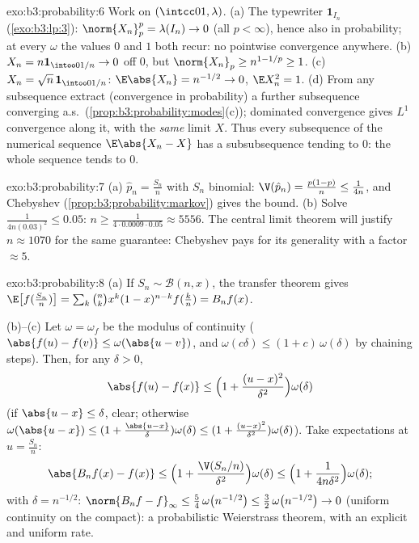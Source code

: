 \begin{solution}{exo:b3:probability:6}
Work on $(\intcc01, \lambda)$.
(a) The typewriter $\mathbf 1_{I_n}$
(\cref{exo:b3:lp:3}): $\norm{X_n}_p^p = \lambda(I_n) \to 0$
(all $p < \infty$), hence also in probability; at every
$\omega$ the values $0$ and $1$ both recur: no pointwise
convergence anywhere.
(b) $X_n = n\mathbf 1_{\intoo0{1/n}} \to 0$ off $0$, but
$\norm{X_n}_p \geq n^{1 - 1/p} \geq 1$.
(c) $X_n = \sqrt n\,\mathbf 1_{\intoo0{1/n}}$: $\E\abs{X_n} =
n^{-1/2} \to 0$, $\E X_n^2 = 1$.
(d) From any subsequence extract (convergence in
probability) a further subsequence converging a.s.\
(\cref{prop:b3:probability:modes}(c)); dominated convergence
gives $L^1$ convergence along it, with the \emph{same} limit
$X$. Thus every subsequence of the numerical sequence
$\E\abs{X_n - X}$ has a subsubsequence tending to $0$: the
whole sequence tends to $0$.
\end{solution}

\begin{solution}{exo:b3:probability:7}
(a) $\hat p_n = \frac{S_n}n$ with $S_n$ binomial: $\V(\hat
p_n) = \frac{p(1-p)}n \leq \frac1{4n}$, and Chebyshev
(\cref{prop:b3:probability:markov}) gives the bound.
(b) Solve $\frac1{4n(0.03)^2} \leq 0.05$: $n \geq
\frac{1}{4\cdot0.0009\cdot0.05} \approx 5556$. The central
limit theorem will justify $n \approx 1070$ for the same
guarantee: Chebyshev pays for its generality with a factor
$\approx 5$.
\end{solution}

\begin{solution}{exo:b3:probability:8}
(a) If $S_n \sim \mathcal B(n, x)$, the transfer theorem
gives $\E\bigl[f(\frac{S_n}n)\bigr] =
\sum_k\binom nkx^k(1-x)^{n-k}f(\frac kn) = B_nf(x)$.

(b)--(c) Let $\omega = \omega_f$ be the modulus of continuity
($\abs{f(u) - f(v)} \leq \omega(\abs{u - v})$, and $\omega(c
\delta) \leq (1 + c)\,\omega(\delta)$ by chaining steps).
Then, for any $\delta > 0$,
\[
\abs{f(u) - f(x)} \leq \Bigl(1 + \frac{(u -
x)^2}{\delta^2}\Bigr)\omega(\delta)
\]
(if $\abs{u - x} \leq \delta$, clear; otherwise
$\omega(\abs{u-x}) \leq (1 + \frac{\abs{u-x}}\delta)
\omega(\delta) \leq (1 + \frac{(u-x)^2}{\delta^2})
\omega(\delta)$). Take expectations at $u = \frac{S_n}n$:
\[
\abs{B_nf(x) - f(x)} \leq
\Bigl(1 + \frac{\V(S_n/n)}{\delta^2}\Bigr)\omega(\delta)
\leq \Bigl(1 + \frac{1}{4n\delta^2}\Bigr)\omega(\delta) ;
\]
with $\delta = n^{-1/2}$: $\norm{B_nf - f}_\infty \leq
\frac54\,\omega\bigl(n^{-1/2}\bigr) \leq
\frac32\,\omega\bigl(n^{-1/2}\bigr) \to 0$ (uniform
continuity on the compact): a probabilistic Weierstrass
theorem, with an explicit and uniform rate.
\end{solution}


